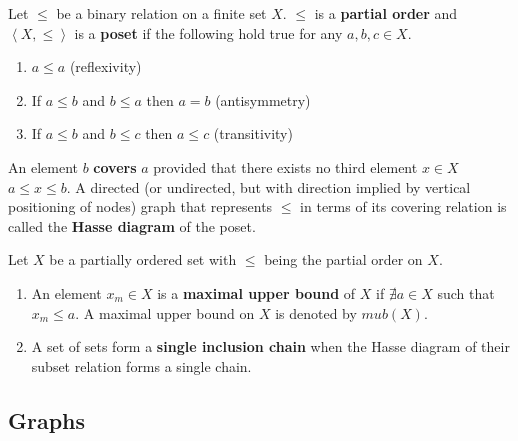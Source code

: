 \def\posetr{\le}

\begin{definition}[Poset]
  \label{def:posetdef}    
  Let $\posetr$ be a binary relation on a finite set $X$. $\posetr$ is a \textbf{
    partial order} and $\left< X,\posetr \right>$  is a \textbf{ poset}
  if the following hold true for any $a, b, c \in X$.
 \parindent  {} 
  \begin{enumerate}
  \item $a \posetr a$ (reflexivity)
  \item If $a \posetr b$ and $b \posetr a$ then $a = b$ (antisymmetry)
  \item If $a \posetr b$ and $b \posetr c$ then $a \posetr c$
    (transitivity)
  \end{enumerate}

  An element $b$ \textbf{covers} $a$ provided that there exists no
  third element $x \in X$ \stt $a \posetr x \posetr b$.  A directed
  (or undirected, but with direction implied by vertical positioning
  of nodes) graph that represents $\posetr$ in terms of its covering
  relation is called the \textbf{Hasse diagram} of the poset.
\end{definition}

\begin{definition}
  \label{def:poset} 
  Let $X$ be a partially ordered set with $\posetr$ being the
  partial order on $X$.

  \begin{enumerate}
  \hangindent {}
  \item An element $x_m \in X$ is a
    \textbf{maximal upper bound} of $X$ if $\nexists a \in X$ such
    that $x_m \posetr a$.  A maximal upper bound on $X$ is
    denoted by $mub(X)$.

  \item A set of sets form a \textbf{single
      inclusion chain} when the Hasse diagram of their subset relation
    forms a single chain.
  \end{enumerate}
\end{definition}

\subsection{Graphs}

